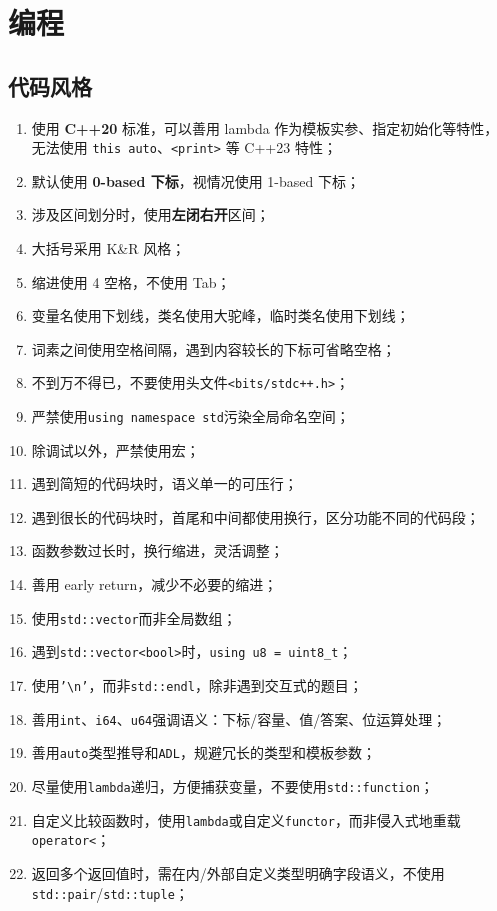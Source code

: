 \section{编程}

\subsection{代码风格}

\begin{enumerate}[itemsep=2pt, topsep=0pt, parsep=0pt]
    \item 使用 {\bf C++20} 标准，可以善用 lambda 作为模板实参、指定初始化等特性，无法使用 {\tt this auto}、{\tt <print>} 等 C++23 特性；
    \item 默认使用 {\bf 0-based 下标}，视情况使用 1-based 下标；
    \item 涉及区间划分时，使用{\bf 左闭右开}区间；
    \item 大括号采用 K\&R 风格；
    \item 缩进使用 4 空格，不使用 Tab；
    \item 变量名使用下划线，类名使用大驼峰，临时类名使用下划线；
    \item 词素之间使用空格间隔，遇到内容较长的下标可省略空格；
    \item 不到万不得已，不要使用头文件{\tt <bits/stdc++.h>}；
    \item 严禁使用{\tt using namespace std}污染全局命名空间；
    \item 除调试以外，严禁使用宏；
    \item 遇到简短的代码块时，语义单一的可压行；
    \item 遇到很长的代码块时，首尾和中间都使用换行，区分功能不同的代码段；
    \item 函数参数过长时，换行缩进，灵活调整；
    \item 善用 early return，减少不必要的缩进；
    \item 使用{\tt std::vector}而非全局数组；
    \item 遇到{\tt std::vector<bool>}时，{\tt using u8 = uint8\_t}；
    \item 使用{\tt '\textbackslash n'}，而非{\tt std::endl}，除非遇到交互式的题目；
    \item 善用{\tt int}、{\tt i64}、{\tt u64}强调语义：下标/容量、值/答案、位运算处理；
    \item 善用{\tt auto}类型推导和{\tt ADL}，规避冗长的类型和模板参数；
    \item 尽量使用{\tt lambda}递归，方便捕获变量，不要使用{\tt std::function}；
    \item 自定义比较函数时，使用{\tt lambda}或自定义{\tt functor}，而非侵入式地重载{\tt operator<}；
    \item 返回多个返回值时，需在内/外部自定义类型明确字段语义，不使用{\tt std::pair}/{\tt std::tuple}；
\end{enumerate}

